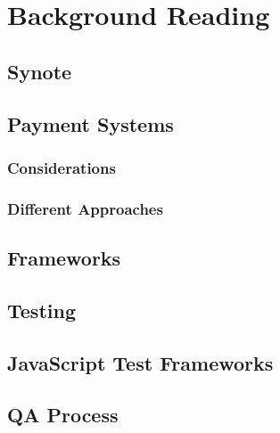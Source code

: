 \chapter{Background Reading}
\label{chap:background-reading}

\section{Synote}
\label{sec:synote}

\section{Payment Systems}
\label{sec:payment-systems}

\subsection{Considerations}
\label{subsec:considerations}

\subsection{Different Approaches}
\label{subsec:different-approaches}

\section{Frameworks}
\label{sec:frameworks}

\section{Testing}
\label{sec:testing}

\section{JavaScript Test Frameworks}
\label{sec:frameworks}

\section{QA Process}
\label{sec:qa-process}